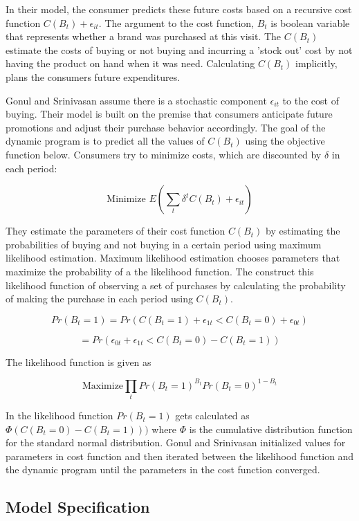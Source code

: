 \documentclass{article}
\begin{document}
In their model, the consumer predicts these future costs based on a recursive cost function $C(B_t) + \epsilon_{it}$. The argument to the cost function, $B_t$ is boolean variable that represents whether a brand was purchased at this visit. The $C(B_t)$ estimate the costs of buying or not buying and incurring a 'stock out' cost by not having the product on hand when it was need. Calculating $C(B_t)$ implicitly, plans the consumers future expenditures.

Gonul and Srinivasan assume there is a stochastic component $\epsilon_{it}$ to the cost of buying. Their model is built on the premise that consumers anticipate future promotions and adjust their purchase behavior accordingly. The goal of the dynamic program is to predict all the values of $C(B_t)$ using the objective function below. Consumers try to minimize costs, which are discounted by $\delta$ in each period:

$$\text{Minimize } E( \sum_t \delta^{t} C(B_t) + \epsilon_{it} )$$

They estimate the parameters of their cost function $C(B_t)$ by estimating the probabilities of buying and not buying in a certain period using maximum likelihood estimation. Maximum likelihood estimation chooses parameters that maximize the probability of a the likelihood function. The construct this likelihood function of observing a set of purchases by calculating the probability of making the purchase in each period using $C(B_t)$. 

$$Pr(B_t=1) = Pr(C(B_t = 1) + \epsilon_{1t} < C(B_t = 0) + \epsilon_{0t} )$$ 

$$=  Pr(  \epsilon_{0t} + \epsilon_{1t} < C(B_t = 0) - C(B_t = 1) )   $$

The likelihood function is given as

$$\text{Maximize} \prod_{t} Pr({B_t= 1})^{B_t} Pr(B_t=0)^{1-B_t} $$

In the likelihood function $ Pr(B_t=1)$ gets calculated as $\Phi(C(B_t = 0) - C(B_t = 1) ) )$ where $\Phi$ is the cumulative distribution function for the standard normal distribution.
Gonul and Srinivasan initialized values for parameters in cost function and then iterated between the likelihood function and the dynamic program until the parameters in the cost function converged.

\subsection{Model Specification}
\end{document}

